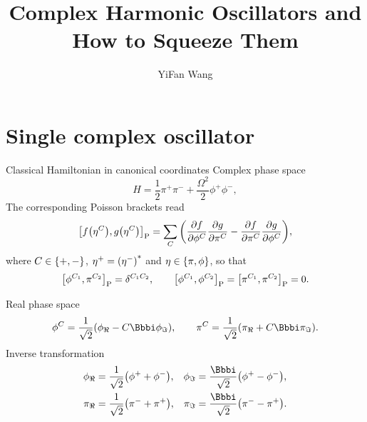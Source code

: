 \documentclass[a4paper]{article}
\title{Complex Harmonic Oscillators and How to Squeeze Them}
\author{YiFan Wang}
\newcommand{\Poibr}[1]{\sbr{#1}_\text{P}}
\newcommand{\tR}{\Re}
\newcommand{\tI}{\Im}
\begin{document}
\maketitle


\tableofcontents

\section{Single complex oscillator}

\begin{nameddef}{Classical Hamiltonian in canonical coordinates}
Complex phase space
\begin{equation}
H = \frac{1}{2}\pi^+\pi^- + \frac{\Omega^2}{2}\phi^+\phi^-,
\end{equation}
The corresponding Poisson brackets read
\begin{equation}
\Poibr{\rfun{f}{\eta^C}, \rfun{g}{\eta^C}} = \sum_C \rbr{
\frpa{f}{\phi^C}\frpa{g}{\pi^C} - \frpa{f}{\pi^C}\frpa{g}{\phi^C}},
\end{equation}
where $C \in {\left\{+, -\right\}}$, $\eta^+ = {\left(\eta^-\right)}^*$ and $\eta \in {\left\{\pi, 
\phi\right\}}$, so that
\begin{equation}
\Poibr{\phi^{C_1}, \pi^{C_2}} = \delta^{C_1 C_2},\qquad
\Poibr{\phi^{C_1}, \phi^{C_2}} = \Poibr{\pi^{C_1}, \pi^{C_2}} = 0.
\end{equation}

Real phase space
\begin{equation}
\phi^C = \frac{1}{\sqrt{2}}\rbr{ \phi_\tR - C \ii \phi_\tI},\qquad
\pi^C = \frac{1}{\sqrt{2}}\rbr{ \pi_\tR + C \ii \pi_\tI}.
\end{equation}
Inverse transformation
\begin{equation}
\begin{aligned}
\phi_\tR &= \frac{1}{\sqrt{2}}\rbr{\phi^+ + \phi^-},
&\phi_\tI &= \frac{\ii}{\sqrt{2}}\rbr{\phi^+ - \phi^-}, \\
\pi_\tR &= \frac{1}{\sqrt{2}}\rbr{\pi^- + \pi^+},
&\pi_\tI &= \frac{\ii}{\sqrt{2}}\rbr{\pi^- - \pi^+}. \\
\end{aligned}
\end{equation}


\end{nameddef}
\end{document}
